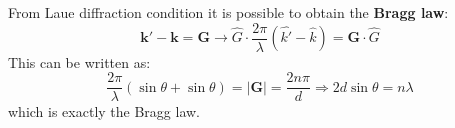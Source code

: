 \documentclass[10.75pt,a4paper,openright,bottom=2cm]{article}
\renewcommand{\Vec}[1]{\boldsymbol{#1}}
\begin{document}
From Laue diffraction condition it is possible to obtain the \textbf{Bragg law}:
\[
\Vec{k}'-\Vec{k}=\Vec{G}\to\hat{G}\cdot\frac{2\pi}{\lambda}(\hat{k'}-\hat{k})=\Vec{G}\cdot\hat{G}
\]
This can be written as:
\[
\frac{2\pi}{\lambda}(\sin\theta+\sin\theta)=|\Vec{G}|=\frac{2n\pi}{d}\Rightarrow2d\sin\theta=n\lambda
\]
which is exactly the Bragg law.
\end{document}
